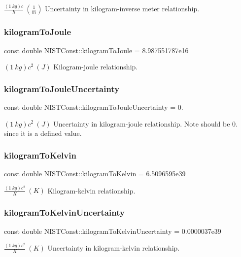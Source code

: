 $\frac{(1\ kg)c}{h} \ (\frac{1}{m})$ Uncertainty in kilogram-\/inverse meter relationship. \mbox{\label{group___kilogram_gaf3635d5c9747ebcd2edadf77388fea9b}} 
\subsubsection{\texorpdfstring{kilogram\+To\+Joule}{kilogramToJoule}}
{\footnotesize\ttfamily const double N\+I\+S\+T\+Const\+::kilogram\+To\+Joule = 8.\+987551787e16}

$(1\ kg)c^2 \ (J)$ Kilogram-\/joule relationship. \mbox{\label{group___kilogram_gacf96db99d7b828aca5c24fda34406550}} 
\subsubsection{\texorpdfstring{kilogram\+To\+Joule\+Uncertainty}{kilogramToJouleUncertainty}}
{\footnotesize\ttfamily const double N\+I\+S\+T\+Const\+::kilogram\+To\+Joule\+Uncertainty = 0.}

$(1\ kg)c^2 \ (J)$ Uncertainty in kilogram-\/joule relationship. Note should be 0. since it is a defined value. \mbox{\label{group___kilogram_ga79d71b550888761f76eaca5ffc4a29cb}} 
\subsubsection{\texorpdfstring{kilogram\+To\+Kelvin}{kilogramToKelvin}}
{\footnotesize\ttfamily const double N\+I\+S\+T\+Const\+::kilogram\+To\+Kelvin = 6.\+5096595e39}

$\frac{(1\ kg)c^2}{K} \ (K)$ Kilogram-\/kelvin relationship. \mbox{\label{group___kilogram_ga744389701b8d90c75aa01618867ed42e}} 
\subsubsection{\texorpdfstring{kilogram\+To\+Kelvin\+Uncertainty}{kilogramToKelvinUncertainty}}
{\footnotesize\ttfamily const double N\+I\+S\+T\+Const\+::kilogram\+To\+Kelvin\+Uncertainty = 0.\+0000037e39}

$\frac{(1\ kg)c^2}{K} \ (K)$ Uncertainty in kilogram-\/kelvin relationship. 
